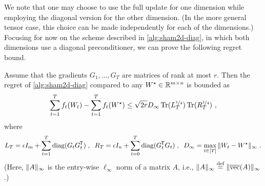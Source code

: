 \begin{algorithm}[t!]
\caption{Diagonal version of \NAME, matrix case.}
\label{alg:sham2d-diag}
\end{algorithm}

We note that one may choose to use the full \NAME update for one dimension while employing the diagonal version for the other dimension. (In the more general tensor case, this choice can be made independently for each of the dimensions.)
Focusing for now on the scheme described in \cref{alg:sham2d-diag}, in which both dimensions use a diagonal preconditioner, we can prove the following regret bound.

\begin{theorem} \label{thm:regret-2d-diag}
Assume that the gradients $G_1,\ldots,G_T$ are matrices of rank at most $r$.
Then the regret of \cref{alg:sham2d-diag} compared to any $W^\star \in \mathbb{R}^{m \times n}$ is bounded as
\begin{align*}
\sum_{t=1}^T f_t(W_t) - \sum_{t=1}^T f_t(W^\star)
\le
\sqrt{2r}D_\infty \operatorname*{Tr}(L_T^{{\smash{\nicefrac{1}{4}}}}) \operatorname*{Tr}(R_T^{{\smash{\nicefrac{1}{4}}}})
~,
\end{align*}
where
$$L_T = \epsilon I_m + \sum_{t=1}^T \operatorname*{diag}(G_t G_t^{\mkern-1.5mu\scriptstyle\mathsf{T}}) \;,\;\;
  R_T = \epsilon I_n + \sum_{t=0}^T \operatorname*{diag}(G_t^{\mkern-1.5mu\scriptstyle\mathsf{T}} G_t) \;,\;\;
  D_\infty = \max_{t \in [T]} \|W_t-W^\star\|_\infty ~.$$
(Here, $\|A\|_\infty$ is the entry-wise $\ell_\infty$ norm of a matrix $A$, i.e., $\|A\|_\infty \stackrel{\text{def}}{=} \|\overline{\mathrm{vec}}(A)\|_\infty$.)
\end{theorem}

